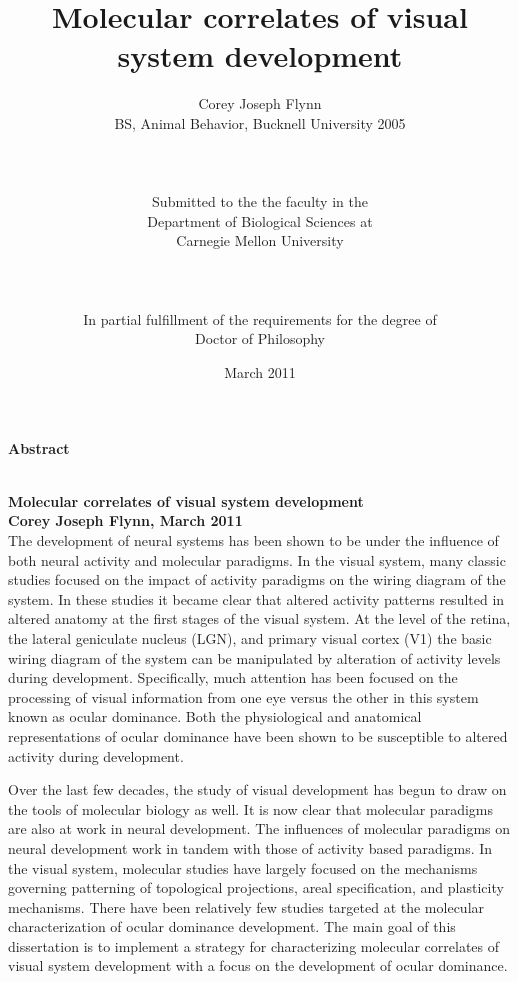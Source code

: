 \documentclass[12pt]{report}
\begin{document}
\normalsize

\title{\Huge{\textbf{Molecular correlates of visual system development}}}
\author{Corey Joseph Flynn\\
		BS, Animal Behavior, Bucknell University 2005
\\		
\\
\\
\\
Submitted to the the faculty in the\\
Department of Biological Sciences at\\
Carnegie Mellon University\\
\\
\\
\\
In partial fulfillment of the requirements for the degree of\\
Doctor of Philosophy 
}
\date{March 2011}
\maketitle
\doublespacing

\begin{raggedleft} \Huge{\textbf{Abstract}}\end{raggedleft}\\
\Large{\textbf{Molecular correlates of visual system development}}\\
\textbf{Corey Joseph Flynn, March 2011}\\
The development of neural systems has been shown to be under the influence of both neural activity and molecular paradigms.  In the visual system, many classic studies focused on the impact of activity paradigms on the wiring diagram of the system.  In these studies it became clear that altered activity patterns resulted in altered anatomy at the first stages of the visual system.  At the level of the retina, the lateral geniculate nucleus (LGN), and primary visual cortex (V1) the basic wiring diagram of the system can be manipulated by alteration of activity levels during development.  Specifically, much attention has been focused on the processing of visual information from one eye versus the other in this system known as ocular dominance.  Both the physiological and anatomical representations of ocular dominance have been shown to be susceptible to altered activity during development.
  
Over the last few decades, the study of visual development has begun to draw on the tools of molecular biology as well.  It is now clear that molecular paradigms are also at work in neural development.  The influences of molecular paradigms on neural development work in tandem with those of activity based paradigms.  In the visual system, molecular studies have largely focused on the mechanisms governing patterning of topological projections, areal specification, and plasticity mechanisms.  There have been relatively few studies targeted at the molecular characterization of ocular dominance development.  The main goal of this dissertation is to implement a strategy for characterizing molecular correlates of visual system development with a focus on the development of ocular dominance.
  
\end{document}
